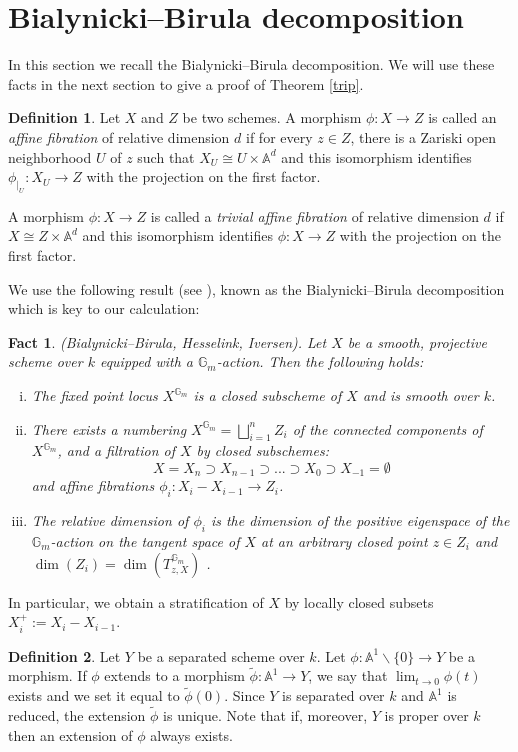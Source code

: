 \documentclass{amsart}
\theoremstyle{plain}
\newtheorem{fact}{Fact}[section]
\theoremstyle{definition}
\newtheorem{definition}{Definition}
\theoremstyle{remark}
\begin{document}
\section{Bialynicki--Birula decomposition}
In this section we recall the Bialynicki--Birula decomposition. We will use these facts in the next section to give a proof of Theorem \ref{trip}.
\begin{definition}\label{affine fibration}
Let $X$ and $Z$ be two schemes. A morphism $\phi : X \rightarrow Z$ is called an \emph{affine fibration} of relative dimension $d$ if for every $z \in Z$, there is a Zariski open neighborhood $U$ of $z$ such that $X_{U} \cong U \times \mathbb{A}^{d}$ and this isomorphism identifies $\phi_{|_{U}} : X_{U} \rightarrow Z$ with the projection on the first factor.

A morphism $\phi : X \rightarrow Z$ is called a \emph{trivial affine fibration} of relative dimension $d$ if $X \cong Z \times \mathbb{A}^{d}$ and this isomorphism identifies $\phi : X \rightarrow Z$ with the projection on the first factor.
\end{definition}
We use the following result (see \cite[Theorem 3.2]{Bro}), known as the Bialynicki--Birula decomposition which is key to our calculation:

\begin{fact}\label{bb1} 
(Bialynicki--Birula, Hesselink, Iversen). 
Let $X$ be a smooth,
projective scheme over $k$ equipped with a $\mathbb{G}_{m}$-action. Then the following holds:
\begin{enumerate}[(i)]
    \item The fixed point locus $X^{\mathbb{G}_{m}}$ is a closed subscheme of $X$ and is smooth over $k$.
    \item There exists a numbering $X^{\mathbb{G}_{m}} = \bigsqcup_{i=1}^{n} Z_{i}$ of the connected components
    of $X^{\mathbb{G}_{m}}$, and a filtration of $X$ by closed subschemes:
    \[
      X=X_{n}\supset X_{n-1}\supset...\supset X_{0}\supset X_{-1}=\emptyset
    \]
    and affine fibrations $\phi_{i}:X_{i}-X_{i-1}\rightarrow Z_{i}$.
    \item The relative dimension of $\phi_{i}$ is the dimension of the positive eigenspace of the
    $\mathbb{G}_{m}$-action on the tangent space of $X$ at
    an arbitrary closed point $z \in Z_{i}$ and $\dim(Z_{i})=\dim(T_{z,X}^{\mathbb{G}_{m}})$ .
\end{enumerate}
\end{fact}
In particular, we obtain a stratification of $X$ by locally closed subsets $X_{i}^{+}:=X_{i}-X_{i-1}$. 
\begin{definition}
Let $Y$ be a separated scheme over $k$. Let $\phi:\mathbb{A}^{1}\backslash\{0\}\rightarrow Y$ be a morphism. If $\phi$ extends to a morphism $\widetilde{\phi}:\mathbb{A}^{1}\rightarrow Y$, we say that $\lim_{t\to 0}\phi(t)$ exists and we set it equal to $\widetilde{\phi}(0)$. Since $Y$ is separated over $k$ and $\mathbb{A}^{1}$ is reduced, the extension $\tilde{\phi}$ is unique. Note that if, moreover, $Y$ is proper over $k$ then an extension of $\phi$ always exists. 
\end{definition}
\end{document}
